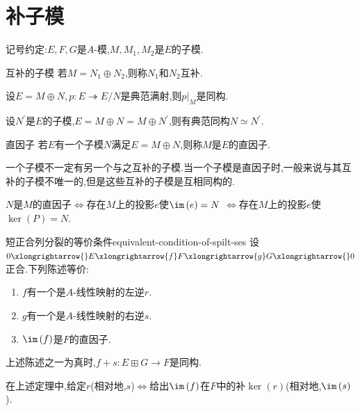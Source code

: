\section{补子模}

记号约定:$E,F,G$是$A$-模,$M,M_{1},M_{2}$是$E$的子模.

\begin{definition}{互补的子模}{}
	若$M=N_{1}\oplus N_{2}$,则称$N_{1}$和$N_{2}$互补.
\end{definition}

\begin{proposition}{}{}
	设$E=M\oplus N,p:E\twoheadrightarrow E/N$是典范满射,则$p|_{M}$是同构.
\end{proposition}

\begin{corollary}{}{}
	设$N^{\prime}$是$E$的子模,$E=M\oplus N=M\oplus N^{\prime}$,则有典范同构$N\simeq N^{\prime}$.
\end{corollary}

\begin{definition}{直因子}{}
	若$E$有一个子模$N$满足$E=M\oplus N$,则称$M$是$E$的直因子.
\end{definition}

\begin{remark}{}{}
	一个子模不一定有另一个与之互补的子模.当一个子模是直因子时,一般来说与其互补的子模不唯一的,但是这些互补的子模是互相同构的.
\end{remark}

\begin{proposition}{}{}
	$N$是$M$的直因子$\iff$存在$M$上的投影$e$使$\im\left(e\right)=N$ $\iff$存在$M$上的投影$e$使$\ker\left(P\right)=N$.
\end{proposition}

\begin{proposition}{短正合列分裂的等价条件}{equivalent-condition-of-spilt-ses}
	设$0\xlongrightarrow{}E\xlongrightarrow{f}F\xlongrightarrow{g}G\xlongrightarrow{}0$正合.下列陈述等价:
	\begin{enumerate}
		\item $f$有一个是$A$-线性映射的左逆$r$.
		\item $g$有一个是$A$-线性映射的右逆$s$.
		\item $\im\left(f\right)$是$F$的直因子.
	\end{enumerate}
	上述陈述之一为真时,$f+s:E\boxplus G\to F$是同构.
\end{proposition}

\begin{remark}{}{}
	在上述定理中,给定$r$(相对地,$s$)$\iff$给出$\im\left(f\right)$在$F$中的补$\ker\left(r\right)$(相对地,$\im\left(s\right)$).
\end{remark}


